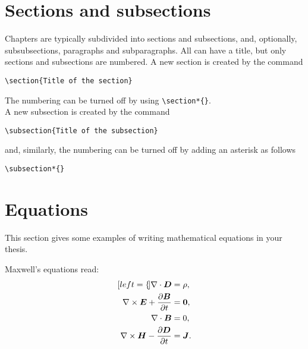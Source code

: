 \documentclass{Configuration_Files/PoliMi3i_thesis}
\begin{document}
\section{Sections and subsections}
\label{sec:section_name}
Chapters are typically subdivided into sections and subsections, and, optionally,
subsubsections, paragraphs and subparagraphs.
All can have a title, but only sections and subsections are numbered.
A new section is created by the command
\begin{verbatim}
\section{Title of the section}
\end{verbatim}
The numbering can be turned off by using \verb|\section*{}|.
\\
A new subsection is created by the command
\begin{verbatim}
\subsection{Title of the subsection}
\end{verbatim}
and, similarly, the numbering can be turned off by adding an asterisk as follows 
\begin{verbatim}
\subsection*{}
\end{verbatim}

\section{Equations}
\label{sec:eqs}
This section gives some examples of writing mathematical equations in your thesis.

Maxwell's equations read:
\begin{subequations}
    \label{eq:maxwell}
    \begin{align}[left=\empheqlbrace]
    \nabla\cdot \bm{D} & = \rho, \label{eq:maxwell1} \\
    \nabla \times \bm{E} +  \frac{\partial \bm{B}}{\partial t} & = \bm{0}, \label{eq:maxwell2} \\
    \nabla\cdot \bm{B} & = 0, \label{eq:maxwell3} \\
    \nabla \times \bm{H} - \frac{\partial \bm{D}}{\partial t} &= \bm{J}. \label{eq:maxwell4}
    \end{align}
\end{subequations}
\end{document}
